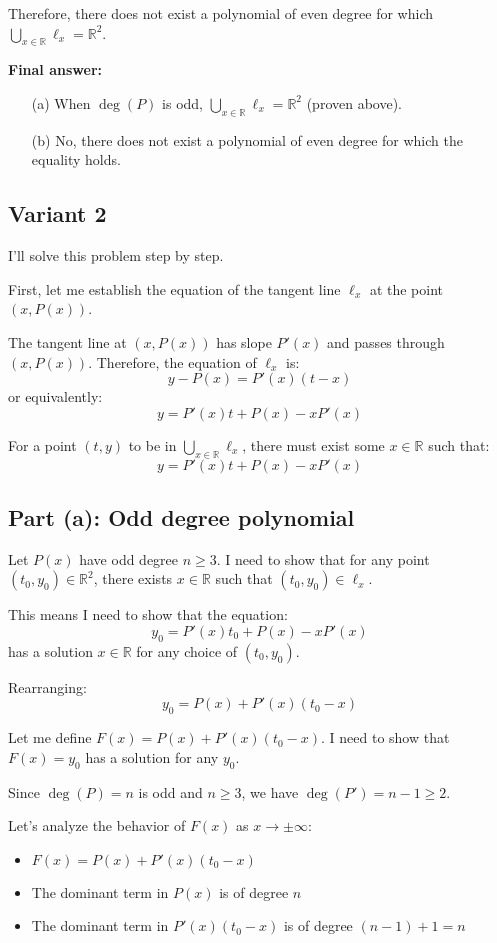 \documentclass[12pt,a4paper]{article}
\theoremstyle{definition}
\begin{document}
    Therefore, there does not exist a polynomial of even degree for which $\bigcup_{x \in \mathbb{R}} \ell_x = \mathbb{R}^2$.

    \textbf{Final answer:}
    \begin{enumerate}
        \item[(a)] When $\deg(P)$ is odd, $\bigcup_{x\in\mathbb{R}}\ell_x = \mathbb{R}^2$ (proven above).
        \item[(b)] No, there does not exist a polynomial of even degree for which the equality holds.
    \end{enumerate}
\subsection{Variant 2}
    I'll solve this problem step by step.

    First, let me establish the equation of the tangent line $\ell_x$ at the point $(x, P(x))$.

    The tangent line at $(x, P(x))$ has slope $P'(x)$ and passes through $(x, P(x))$. Therefore, the equation of $\ell_x$ is:
    $$y - P(x) = P'(x)(t - x)$$
    or equivalently:
    $$y = P'(x)t + P(x) - xP'(x)$$

    For a point $(t, y)$ to be in $\bigcup_{x \in \mathbb{R}} \ell_x$, there must exist some $x \in \mathbb{R}$ such that:
    $$y = P'(x)t + P(x) - xP'(x)$$

    \subsection*{Part (a): Odd degree polynomial}

    Let $P(x)$ have odd degree $n \geq 3$. I need to show that for any point $(t_0, y_0) \in \mathbb{R}^2$, there exists $x \in \mathbb{R}$ such that $(t_0, y_0) \in \ell_x$.

    This means I need to show that the equation:
    $$y_0 = P'(x)t_0 + P(x) - xP'(x)$$
    has a solution $x \in \mathbb{R}$ for any choice of $(t_0, y_0)$.

    Rearranging:
    $$y_0 = P(x) + P'(x)(t_0 - x)$$

    Let me define $F(x) = P(x) + P'(x)(t_0 - x)$. I need to show that $F(x) = y_0$ has a solution for any $y_0$.

    Since $\deg(P) = n$ is odd and $n \geq 3$, we have $\deg(P') = n-1 \geq 2$.

    Let's analyze the behavior of $F(x)$ as $x \to \pm\infty$:
    \begin{itemize}
        \item $F(x) = P(x) + P'(x)(t_0 - x)$
        \item The dominant term in $P(x)$ is of degree $n$
        \item The dominant term in $P'(x)(t_0 - x)$ is of degree $(n-1) + 1 = n$
    \end{itemize}
\end{document}
